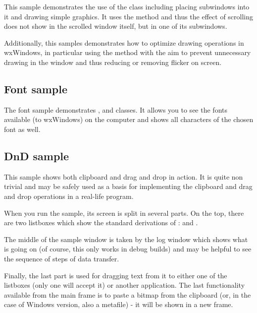 This sample demonstrates the use of the 
class including placing subwindows into it and drawing simple graphics. It uses the
 method and thus the effect
of scrolling does not show in the scrolled window itself, but in one of its subwindows.

Additionally, this samples demonstrates how to optimize drawing operations in wxWindows,
in particular using the  method with 
the aim to prevent unnecessary drawing in the window and thus reducing or removing 
flicker on screen.

\subsection{Font sample}\label{samplefont}

The font sample demonstrates , 
 and 
 classes. It allows you to see the fonts
available (to wxWindows) on the computer and shows all characters of the
chosen font as well.

\subsection{DnD sample}\label{samplednd}

This sample shows both clipboard and drag and drop in action. It is quite non
trivial and may be safely used as a basis for implementing the clipboard and
drag and drop operations in a real-life program.

When you run the sample, its screen is split in several parts. On the top,
there are two listboxes which show the standard derivations of 
: 
 and 
.

The middle of the sample window is taken by the log window which shows what is
going on (of course, this only works in debug builds) and may be helpful to see
the sequence of steps of data transfer.

Finally, the last part is used for dragging text from it to either one of the
listboxes (only one will accept it) or another application. The last
functionality available from the main frame is to paste a bitmap from the
clipboard (or, in the case of Windows version, also a metafile) - it will be
shown in a new frame.

